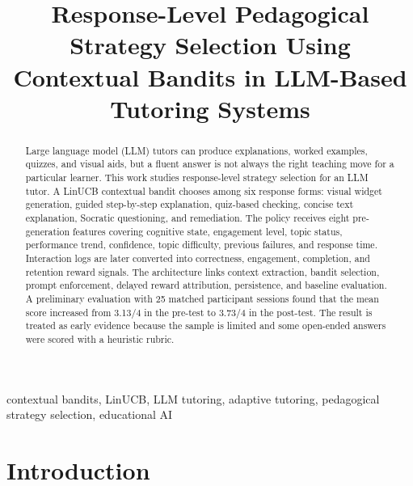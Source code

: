 \documentclass[conference]{IEEEtran}
\begin{document}
\title{Response-Level Pedagogical Strategy Selection Using
Contextual Bandits in LLM-Based Tutoring Systems}

\author{
\and
{}
}

\maketitle

\begin{abstract}
Large language model (LLM) tutors can produce explanations, worked examples, quizzes, and visual aids, but a fluent answer is not always the right teaching move for a particular learner. This work studies response-level strategy selection for an LLM tutor. A LinUCB contextual bandit chooses among six response forms: visual widget generation, guided step-by-step explanation, quiz-based checking, concise text explanation, Socratic questioning, and remediation. The policy receives eight pre-generation features covering cognitive state, engagement level, topic status, performance trend, confidence, topic difficulty, previous failures, and response time. Interaction logs are later converted into correctness, engagement, completion, and retention reward signals. The architecture links context extraction, bandit selection, prompt enforcement, delayed reward attribution, persistence, and baseline evaluation. A preliminary evaluation with 25 matched participant sessions found that the mean score increased from 3.13/4 in the pre-test to 3.73/4 in the post-test. The result is treated as early evidence because the sample is limited and some open-ended answers were scored with a heuristic rubric.
\end{abstract}

\begin{IEEEkeywords}
contextual bandits, LinUCB, LLM tutoring, adaptive tutoring, pedagogical strategy selection, educational AI
\end{IEEEkeywords}

\section{Introduction}
\end{document}
